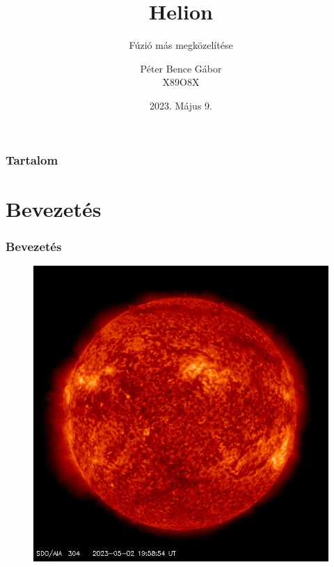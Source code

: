 \documentclass{beamer}
\title{Helion}
\subtitle{Fúzió más megközelítése}
\author[Péter Bence]{Péter Bence Gábor\\X89O8X}
\institute{Széchenyi István Egyetem}
\date{2023. Május 9.}
\begin{document}
\titlepage


\begin{frame}
    \frametitle{Tartalom}
    \tableofcontents
\end{frame}


\section{Bevezetés}
\begin{frame}
    \frametitle{Bevezetés}
    \begin{figure}
        \includegraphics[scale=0.30]{latest_512_0304.jpg}

\end{figure}
\end{frame}
\end{document}

